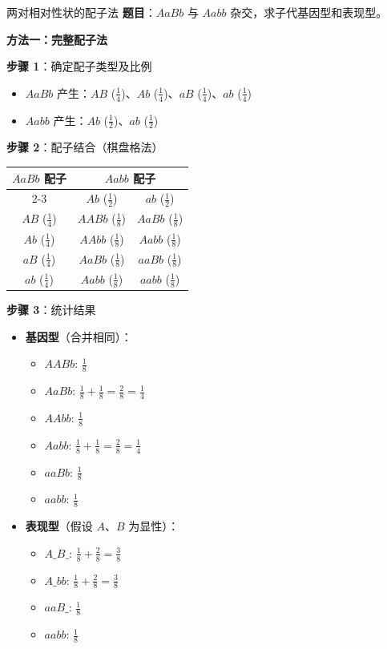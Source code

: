 \documentclass[a4paper,11pt]{ctexart}
\begin{document}
\begin{examplebox}{两对相对性状的配子法}
\textbf{题目}：$AaBb$ 与 $Aabb$ 杂交，求子代基因型和表现型。

\textbf{方法一：完整配子法}

\textbf{步骤 1}：确定配子类型及比例
\begin{itemize}[leftmargin=2em]
    \item $AaBb$ 产生：$AB$ ($\frac{1}{4}$)、$Ab$ ($\frac{1}{4}$)、$aB$ ($\frac{1}{4}$)、$ab$ ($\frac{1}{4}$)
    \item $Aabb$ 产生：$Ab$ ($\frac{1}{2}$)、$ab$ ($\frac{1}{2}$)
\end{itemize}

\textbf{步骤 2}：配子结合（棋盘格法）

\begin{center}
\begin{tabular}{|c|c|c|}
\hline
\multirow{2}{*}{$AaBb$ 配子} & \multicolumn{2}{c|}{$Aabb$ 配子} \\
\cline{2-3}
 & $Ab$ ($\frac{1}{2}$) & $ab$ ($\frac{1}{2}$) \\
\hline
$AB$ ($\frac{1}{4}$) & $AABb$ ($\frac{1}{8}$) & $AaBb$ ($\frac{1}{8}$) \\
\hline
$Ab$ ($\frac{1}{4}$) & $AAbb$ ($\frac{1}{8}$) & $Aabb$ ($\frac{1}{8}$) \\
\hline
$aB$ ($\frac{1}{4}$) & $AaBb$ ($\frac{1}{8}$) & $aaBb$ ($\frac{1}{8}$) \\
\hline
$ab$ ($\frac{1}{4}$) & $Aabb$ ($\frac{1}{8}$) & $aabb$ ($\frac{1}{8}$) \\
\hline
\end{tabular}
\end{center}

\textbf{步骤 3}：统计结果
\begin{itemize}[leftmargin=2em]
    \item \textbf{基因型}（合并相同）：
        \begin{itemize}
            \item $AABb$: $\frac{1}{8}$
            \item $AaBb$: $\frac{1}{8} + \frac{1}{8} = \frac{2}{8} = \frac{1}{4}$
            \item $AAbb$: $\frac{1}{8}$
            \item $Aabb$: $\frac{1}{8} + \frac{1}{8} = \frac{2}{8} = \frac{1}{4}$
            \item $aaBb$: $\frac{1}{8}$
            \item $aabb$: $\frac{1}{8}$
        \end{itemize}
    \item \textbf{表现型}（假设 $A$、$B$ 为显性）：
        \begin{itemize}
            \item $A\_B\_$: $\frac{1}{8} + \frac{2}{8} = \frac{3}{8}$
            \item $A\_bb$: $\frac{1}{8} + \frac{2}{8} = \frac{3}{8}$
            \item $aaB\_$: $\frac{1}{8}$
            \item $aabb$: $\frac{1}{8}$
        \end{itemize}
\end{itemize}


\end{examplebox}
\end{document}
